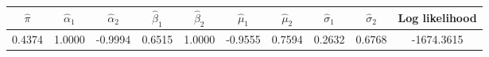 \begin{tabular}{c |c |c |c |c |c |c |c |c |c}
$\hat\pi$ & $\hat\alpha_1$ & $\hat\alpha_2$ & $\hat\beta_1$ & $\hat\beta_2$ & $\hat\mu_1$ & $\hat\mu_2$ & $\hat\sigma_1$ & $\hat\sigma_2$ & Log likelihood \\
    \hline
  0.4374 & 1.0000 & -0.9994 & 0.6515 & 1.0000 & -0.9555 & 0.7594 & 0.2632 & 0.6768 & -1674.3615 \\
\end{tabular}
